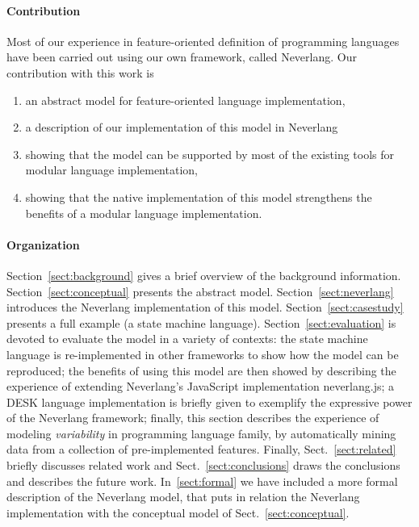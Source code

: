 \paragraph{Contribution}
Most of our experience in feature-oriented definition of programming languages have been carried out using our own framework, called Neverlang. Our contribution with this work is
\begin{enumerate}
   \item an abstract model for feature-oriented language implementation,
   \item a description of our implementation of this model in Neverlang 
   \item showing that the model can be supported by most of the existing tools for modular language implementation, 
   \item showing that the native implementation of this model strengthens the benefits of a modular language implementation.
\end{enumerate}

\paragraph{Organization}  Section~\ref{sect:background} gives a brief overview of the background information. Section~\ref{sect:conceptual} presents the abstract model. Section~\ref{sect:neverlang} introduces the Neverlang implementation of this model. Section~\ref{sect:casestudy} presents a full example (a state machine language). Section~\ref{sect:evaluation} is devoted to evaluate the model in a variety of contexts: the state machine language is re-implemented in other frameworks to show how the model can be reproduced; the benefits of using this model are then showed by describing the experience of extending Neverlang's JavaScript implementation \textsf{neverlang.js}; a DESK language implementation is briefly given to exemplify the expressive power of the Neverlang framework; finally, this section describes the experience of modeling \textit{variability} in programming language family, by automatically mining data from a collection of pre-implemented features.
Finally, Sect.~\ref{sect:related} briefly discusses related work and Sect.~\ref{sect:conclusions} draws the conclusions and describes the future work.
In~\ref{sect:formal} we have included a more formal description of the Neverlang model, that puts in relation the Neverlang implementation with the conceptual model of Sect.~\ref{sect:conceptual}.


